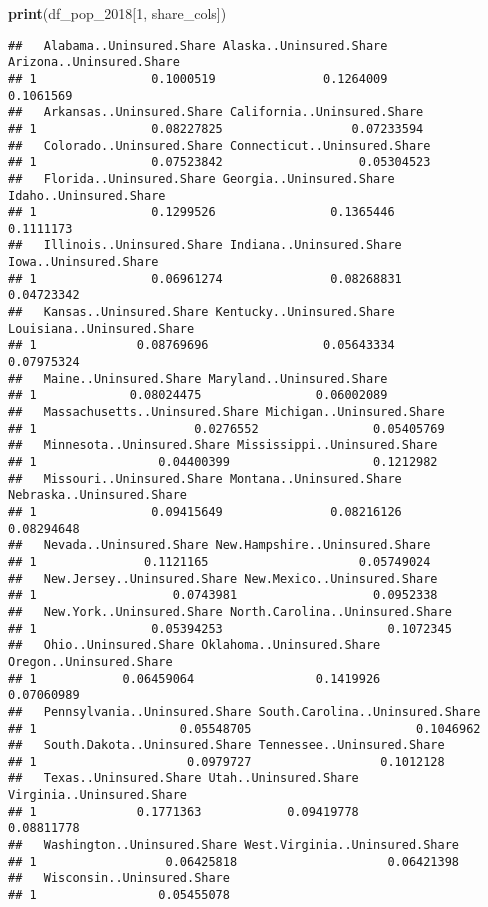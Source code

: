 \documentclass[
]{article}
\newenvironment{Shaded}{\begin{snugshade}}{\end{snugshade}}
\newcommand{\DecValTok}[1]{\textcolor[rgb]{0.00,0.00,0.81}{#1}}
\newcommand{\FunctionTok}[1]{\textcolor[rgb]{0.13,0.29,0.53}{\textbf{#1}}}
\newcommand{\NormalTok}[1]{#1}
\begin{document}
\begin{Shaded}
\begin{Highlighting}[]
\FunctionTok{print}\NormalTok{(df\_pop\_2018[}\DecValTok{1}\NormalTok{, share\_cols])}
\end{Highlighting}
\end{Shaded}

\begin{verbatim}
##   Alabama..Uninsured.Share Alaska..Uninsured.Share Arizona..Uninsured.Share
## 1                0.1000519               0.1264009                0.1061569
##   Arkansas..Uninsured.Share California..Uninsured.Share
## 1                0.08227825                  0.07233594
##   Colorado..Uninsured.Share Connecticut..Uninsured.Share
## 1                0.07523842                   0.05304523
##   Florida..Uninsured.Share Georgia..Uninsured.Share Idaho..Uninsured.Share
## 1                0.1299526                0.1365446              0.1111173
##   Illinois..Uninsured.Share Indiana..Uninsured.Share Iowa..Uninsured.Share
## 1                0.06961274               0.08268831            0.04723342
##   Kansas..Uninsured.Share Kentucky..Uninsured.Share Louisiana..Uninsured.Share
## 1              0.08769696                0.05643334                 0.07975324
##   Maine..Uninsured.Share Maryland..Uninsured.Share
## 1             0.08024475                0.06002089
##   Massachusetts..Uninsured.Share Michigan..Uninsured.Share
## 1                      0.0276552                0.05405769
##   Minnesota..Uninsured.Share Mississippi..Uninsured.Share
## 1                 0.04400399                    0.1212982
##   Missouri..Uninsured.Share Montana..Uninsured.Share Nebraska..Uninsured.Share
## 1                0.09415649               0.08216126                0.08294648
##   Nevada..Uninsured.Share New.Hampshire..Uninsured.Share
## 1               0.1121165                     0.05749024
##   New.Jersey..Uninsured.Share New.Mexico..Uninsured.Share
## 1                   0.0743981                   0.0952338
##   New.York..Uninsured.Share North.Carolina..Uninsured.Share
## 1                0.05394253                       0.1072345
##   Ohio..Uninsured.Share Oklahoma..Uninsured.Share Oregon..Uninsured.Share
## 1            0.06459064                 0.1419926              0.07060989
##   Pennsylvania..Uninsured.Share South.Carolina..Uninsured.Share
## 1                    0.05548705                       0.1046962
##   South.Dakota..Uninsured.Share Tennessee..Uninsured.Share
## 1                     0.0979727                  0.1012128
##   Texas..Uninsured.Share Utah..Uninsured.Share Virginia..Uninsured.Share
## 1              0.1771363            0.09419778                0.08811778
##   Washington..Uninsured.Share West.Virginia..Uninsured.Share
## 1                  0.06425818                     0.06421398
##   Wisconsin..Uninsured.Share
## 1                 0.05455078
\end{verbatim}
\end{document}
